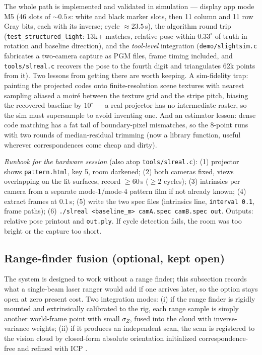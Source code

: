 \documentclass[11pt]{article}
\theoremstyle{definition}
\newcommand{\code}[1]{\texttt{#1}}
\begin{document}
The whole path is implemented and validated in simulation ---
display app mode M5 (46 slots of $\sim$$0.5$\,s: white and black
marker slots, then 11 column and 11 row Gray bits, each with its
inverse; cycle $\approx23.5$\,s), the algorithm round trip
(\code{test\_structured\_light}: 13k+ matches, relative pose within
$0.33^\circ$ of truth in rotation and baseline direction), and the
\emph{tool-level} integration (\code{demo/slightsim.c} fabricates a
two-camera capture as PGM files, frame timing included, and
\code{tools/slreal.c} recovers the pose to the fourth digit and
triangulates 62k points from it). Two lessons from getting there are
worth keeping. A sim-fidelity trap: painting the projected codes onto
finite-resolution scene textures with nearest sampling aliased a
moir\'e between the texture grid and the stripe pitch, biasing the
recovered baseline by $10^\circ$ --- a real projector has no
intermediate raster, so the sim must supersample to avoid inventing
one. And an estimator lesson: dense code matching has a fat tail of
boundary-pixel mismatches, so the 8-point runs with two rounds of
median-residual trimming (now a library function, useful wherever
correspondences come cheap and dirty).

\emph{Runbook for the hardware session} (also atop
\code{tools/slreal.c}): (1) projector shows \code{pattern.html},
key 5, room darkened; (2) both cameras fixed, views overlapping on
the lit surfaces, record $\geq60$\,s ($\geq2$ cycles); (3)
intrinsics per camera from a separate mode-1/mode-4 pattern film if
not already known; (4) extract frames at $0.1$\,s; (5) write the
two spec files (intrinsics line, \code{interval 0.1}, frame paths);
(6) \code{./slreal <baseline\_m> camA.spec camB.spec out}. Outputs:
relative pose printout and \code{out.ply}. If cycle detection fails,
the room was too bright or the capture too short.

\subsection{Range-finder fusion (optional, kept open)}
\label{sec:range}

The system is designed to work without a range finder; this subsection
records what a single-beam laser ranger would add if one arrives later, so
the option stays open at zero present cost. Two integration modes:
(i) if the range finder is rigidly mounted and extrinsically calibrated to
the rig, each range sample is simply another world-frame point with small
$\sigma_Z$, fused into the cloud with inverse-variance weights; (ii) if it
produces an independent scan, the scan is registered to the vision cloud by
closed-form absolute orientation \cite{Horn1987} initialized
correspondence-free and refined with ICP \cite{BeslMcKay1992}.
\end{document}
